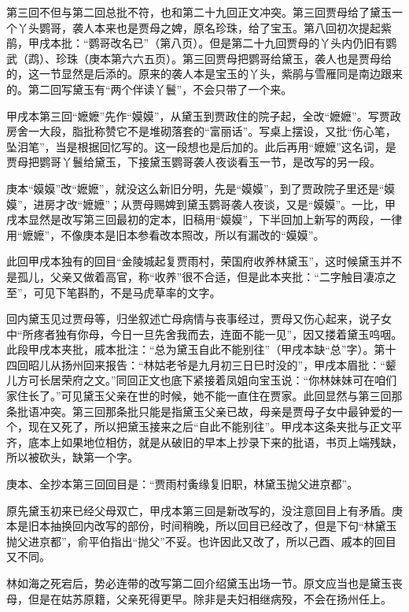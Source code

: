 \par 第三回不但与第二回总批不符，也和第二十九回正文冲突。第三回贾母给了黛玉一个丫头鹦哥，袭人本来也是贾母之婢，原名珍珠，给了宝玉。第八回初次提起紫鹃，甲戌本批：“鹦哥改名已”（第八页）。但是第二十九回贾母的丫头内仍旧有鹦武（鹉）、珍珠（庚本第六六五页）。第三回贾母把鹦哥给黛玉，袭人也是贾母给的，这一节显然是后添的。原来的袭人本是宝玉的丫头，紫鹃与雪雁同是南边跟来的。第二回写黛玉有“两个伴读丫鬟”，不会只带了一个来。
\par 甲戌本第三回“嬷嬷”先作“嫫嫫”，从黛玉到贾政住的院子起，全改“嬷嬷”。写贾政房舍一大段，脂批称赞它不是堆砌落套的“富丽话”。写桌上摆设，又批“伤心笔，坠泪笔”，当是根据回忆写的。这一段想也是后加的。此后再用“嬷嬷”这名词，是贾母把鹦哥丫鬟给黛玉，下接黛玉鹦哥袭人夜谈看玉一节，是改写的另一段。
\par 庚本“嫫嫫”改“嬷嬷”，就没这么新旧分明，先是“嫫嫫”，到了贾政院子里还是“嫫嫫”，进房才改“嬷嬷”；从贾母赐婢到黛玉鹦哥袭人夜谈，又是“嫫嫫”。一比，甲戌本显然是改写第三回最初的定本，旧稿用“嫫嫫”，下半回加上新写的两段，一律用“嬷嬷”，不像庚本是旧本参看改本照改，所以有漏改的“嫫嫫”。
\par 此回甲戌本独有的回目“金陵城起复贾雨村，荣国府收养林黛玉”，这时候黛玉并不是孤儿，父亲又做着高官，称“收养”很不合适，但是此本夹批：“二字触目凄凉之至”，可见下笔斟酌，不是马虎草率的文字。
\par 回内黛玉见过贾母等，归坐叙述亡母病情与丧事经过，贾母又伤心起来，说子女中“所疼者独有你母，今日一旦先舍我而去，连面不能一见”，因又搂着黛玉呜咽。此段甲戌本夹批，戚本批注：“总为黛玉自此不能别往”（甲戌本缺“总”字）。第十四回昭儿从扬州回来报告：“林姑老爷是九月初三日巳时没的”，甲戌本眉批：“颦儿方可长居荣府之文。”同回正文也底下紧接着凤姐向宝玉说：“你林妹妹可在咱们家住长了。”可见黛玉父亲在世的时候，她不能一直住在贾家。此回显然与第三回那条批语冲突。第三回那条批只能是指黛玉父亲已故，母亲是贾母子女中最钟爱的一个，现在又死了，所以把黛玉接来之后“自此不能别往”。甲戌本这条夹批与正文平齐，底本上如果地位相仿，就是从破旧的早本上抄录下来的批语，书页上端残缺，所以被砍头，缺第一个字。
\par 庚本、全抄本第三回回目是：“贾雨村夤缘复旧职，林黛玉抛父进京都”。
\par 原先黛玉初来已经父母双亡，甲戌本第三回是新改写的，没注意回目上有矛盾。庚本是旧本抽换回内改写的部份，时间稍晚，所以回目已经改了，但是下句“林黛玉抛父进京都”，俞平伯指出“抛父”不妥。也许因此又改了，所以己酉、戚本的回目又不同。
\par 林如海之死宕后，势必连带的改写第二回介绍黛玉出场一节。原文应当也是黛玉丧母，但是在姑苏原籍，父亲死得更早。除非是夫妇相继病殁，不会在扬州任上。
